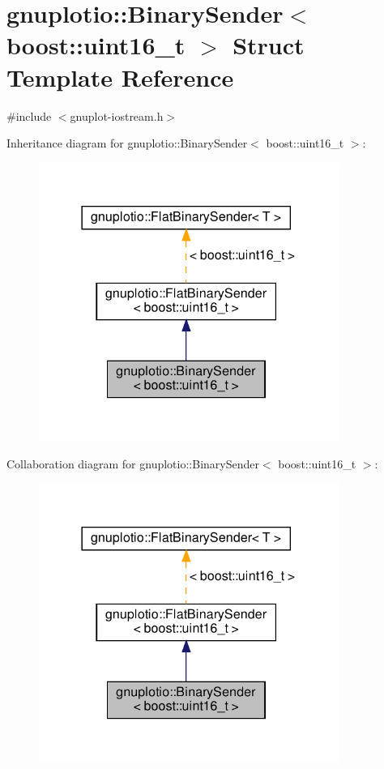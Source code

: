 \hypertarget{structgnuplotio_1_1_binary_sender_3_01boost_1_1uint16__t_01_4}{}\section{gnuplotio\+:\+:Binary\+Sender$<$ boost\+:\+:uint16\+\_\+t $>$ Struct Template Reference}
\label{structgnuplotio_1_1_binary_sender_3_01boost_1_1uint16__t_01_4}


{\ttfamily \#include $<$gnuplot-\/iostream.\+h$>$}



Inheritance diagram for gnuplotio\+:\+:Binary\+Sender$<$ boost\+:\+:uint16\+\_\+t $>$\+:
\nopagebreak
\begin{figure}[H]
\begin{center}
\leavevmode
\includegraphics[width=278pt]{structgnuplotio_1_1_binary_sender_3_01boost_1_1uint16__t_01_4__inherit__graph}
\end{center}
\end{figure}


Collaboration diagram for gnuplotio\+:\+:Binary\+Sender$<$ boost\+:\+:uint16\+\_\+t $>$\+:
\nopagebreak
\begin{figure}[H]
\begin{center}
\leavevmode
\includegraphics[width=278pt]{structgnuplotio_1_1_binary_sender_3_01boost_1_1uint16__t_01_4__coll__graph}
\end{center}
\end{figure}
